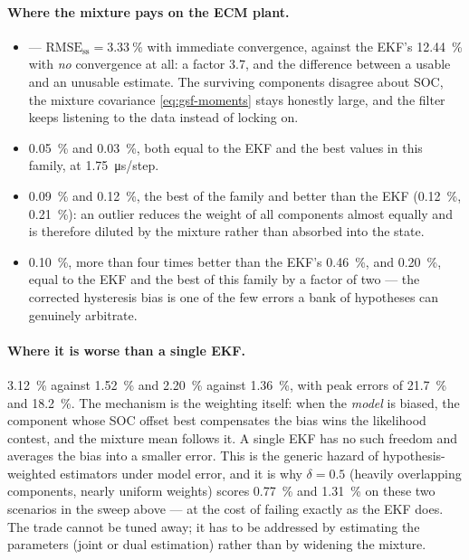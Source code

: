 \paragraph{Where the mixture pays on the ECM plant.}
\begin{itemize}[leftmargin=2em]
  \item {} --- $\mathrm{RMSE}_{\mathrm{ss}} = \SI{3.33}{\percent}$ with immediate
        convergence, against the EKF's \SI{12.44}{\percent} with \emph{no} convergence at all: a
        factor \num{3.7}, and the difference between a usable and an unusable estimate.  The
        surviving components disagree about SOC, the mixture covariance \eqref{eq:gsf-moments}
        stays honestly large, and the filter keeps listening to the data instead of locking on.
  \item {} \SI{0.05}{\percent} and  \SI{0.03}{\percent}, both equal to the
        EKF and the best values in this family, at \SI{1.75}{\micro\second}/step.
  \item {} \SI{0.09}{\percent} and  \SI{0.12}{\percent}, the best of
        the family and better than the EKF (\SI{0.12}{\percent}, \SI{0.21}{\percent}): an outlier
        reduces the weight of all components almost equally and is therefore diluted by the mixture
        rather than absorbed into the state.
  \item {} \SI{0.10}{\percent}, more than four times better than the EKF's
        \SI{0.46}{\percent}, and  \SI{0.20}{\percent}, equal to the EKF and the best
        of this family by a factor of two --- the corrected hysteresis bias is one of the few
        errors a bank of hypotheses can genuinely arbitrate.
\end{itemize}

\paragraph{Where it is worse than a single EKF.}
 \SI{3.12}{\percent} against \SI{1.52}{\percent} and 
\SI{2.20}{\percent} against \SI{1.36}{\percent}, with peak errors of \SI{21.7}{\percent} and
\SI{18.2}{\percent}.  The mechanism is the weighting itself: when the \emph{model} is biased, the
component whose SOC offset best compensates the bias wins the likelihood contest, and the mixture
mean follows it.  A single EKF has no such freedom and averages the bias into a smaller error.  This
is the generic hazard of hypothesis-weighted estimators under model error, and it is why
$\delta = 0.5$ (heavily overlapping components, nearly uniform weights) scores \SI{0.77}{\percent}
and \SI{1.31}{\percent} on these two scenarios in the sweep above --- at the cost of failing
 exactly as the EKF does.  The trade cannot be tuned away; it has to be addressed by
estimating the parameters (joint or dual estimation) rather than by widening the mixture.

